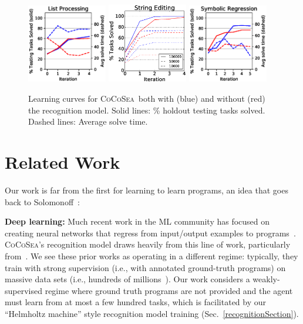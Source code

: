 \documentclass{article}
\newcommand{\system}{\textsc{CoCoSea}~}
\newcommand{\systemEnding}{\textsc{CoCoSea}}
\begin{document}
\begin{figure}\centering
  \includegraphics[width = 3.5cm]{figures/list.eps}
  \includegraphics[width = 3.5cm]{figures/textLearningCurve.eps}        
  \includegraphics[width = 3.5cm]{figures/rationalCurve.eps} 
  \caption{Learning curves for \system both with (blue) and without (red) the recognition model. Solid lines: \% holdout testing tasks solved. Dashed lines: Average solve time.}\label{learningCurves} 
\end{figure}

\section{Related Work}
 Our work is far from the first for learning to learn programs,
 an idea that goes back to Solomonoff~\cite{solomonoff1989system}:

 \noindent \textbf{Deep learning:} Much recent work in the ML community has
 focused on creating neural networks that regress from
 input/output examples to programs~\cite{devlin2017robustfill,devlin2017neural,menon2013machine,balog2016deepcoder}. %
\systemEnding's recognition model draws heavily from this line of work, particularly from~\cite{menon2013machine}.
We see these prior works as operating in a different regime: typically, they train with strong supervision (i.e., with annotated ground-truth programs) on massive data sets (i.e., hundreds of millions~\cite{devlin2017robustfill}).
 Our work   considers a weakly-supervised regime where ground truth programs are not provided and
 the agent must learn from at most a few hundred tasks,
 which is facilitated by our ``Helmholtz machine'' style recognition model training (Sec.~\ref{recognitionSection}).
 
\end{document}
